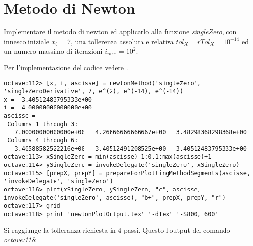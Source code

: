 \section{Metodo di Newton}
\label{sec:metodoDiNewton}

\begin{exercise}
Implementare il metodo di newton ed applicarlo alla funzione \emph{singleZero},
con innesco iniziale $x_{0} = 7$, una tollerenza assoluta e relativa
$tol_{X} = rTol_{X} = 10^{-14}$ ed un numero massimo di iterazioni
$i_{max} = 10^{2}$.
\end{exercise}
Per l'implementazione del codice vedere .
\begin{lstlisting}
octave:112> [x, i, ascisse] = newtonMethod('singleZero', 'singleZeroDerivative', 7, e^(2), e^(-14), e^(-14))
x =  3.40512483795333e+00
i =  4.00000000000000e+00
ascisse =
 Columns 1 through 3:
   7.00000000000000e+00   4.26666666666667e+00   3.48298368298368e+00
 Columns 4 through 6:
   3.40588582522216e+00   3.40512491208525e+00   3.40512483795333e+00
octave:113> xSingleZero = min(ascisse)-1:0.1:max(ascisse)+1
octave:114> ySingleZero = invokeDelegate('singleZero', xSingleZero)
octave:115> [prepX, prepY] = prepareForPlottingMethodSegments(ascisse, 'invokeDelegate', 'singleZero')
octave:116> plot(xSingleZero, ySingleZero, "c", ascisse, invokeDelegate('singleZero', ascisse), "b+", prepX, prepY, "r")
octave:117> grid
octave:118> print 'newtonPlotOutput.tex' '-dTex' '-S800, 600'
\end{lstlisting}
Si raggiunge la tolleranza richiesta in 4 passi. Questo l'output del comando
\emph{octave:118}:
\begin{center}

\end{center}